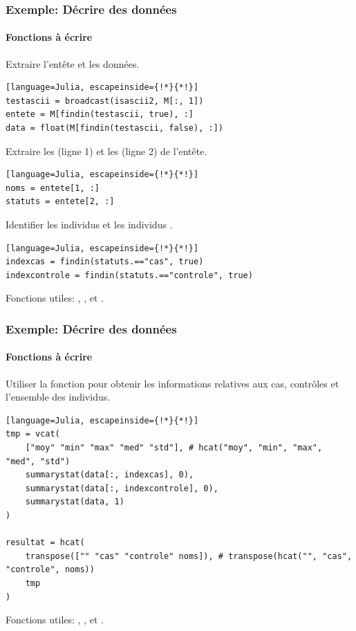 \begin{frame}[fragile]
    \frametitle{\textcolor{goldenrod2}{Exemple:} Décrire des données}
    \framesubtitle{Fonctions à écrire}
    \par{Extraire l'entête et les données.}
\begin{lstlisting}[language=Julia, escapeinside={!*}{*!}]
testascii = broadcast(isascii2, M[:, 1])
entete = M[findin(testascii, true), :]
data = float(M[findin(testascii, false), :])
\end{lstlisting}
    \par{Extraire les  (ligne 1) et les  (ligne 2) de l'entête.}
\begin{lstlisting}[language=Julia, escapeinside={!*}{*!}]
noms = entete[1, :]
statuts = entete[2, :]
\end{lstlisting}
    \par{Identifier les individus  et les individus .}
\begin{lstlisting}[language=Julia, escapeinside={!*}{*!}]
indexcas = findin(statuts.=="cas", true)
indexcontrole = findin(statuts.=="controle", true)
\end{lstlisting}
    \vspace{2ex}
    \par{Fonctions utiles: , ,  et .}
\end{frame}


\begin{frame}[fragile]
    \frametitle{\textcolor{goldenrod2}{Exemple:} Décrire des données}
    \framesubtitle{Fonctions à écrire}
\par{Utiliser la fonction  pour obtenir les informations relatives aux cas, contrôles et l'ensemble des individus.}
\begin{lstlisting}[language=Julia, escapeinside={!*}{*!}]
tmp = vcat(
    ["moy" "min" "max" "med" "std"], # hcat("moy", "min", "max", "med", "std")
    summarystat(data[:, indexcas], 0),
    summarystat(data[:, indexcontrole], 0),
    summarystat(data, 1)
)

resultat = hcat(
    transpose(["" "cas" "controle" noms]), # transpose(hcat("", "cas", "controle", noms))
    tmp
)
\end{lstlisting}
    \vspace{2ex}
    \par{Fonctions utiles: , ,  et .}
\end{frame}


